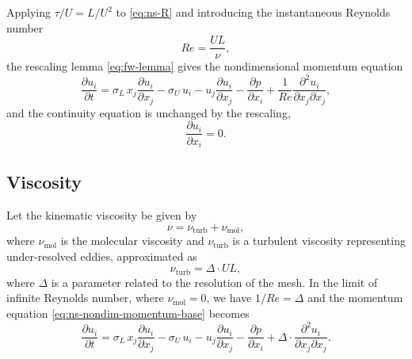 Applying $\tau / U = L/U^2$ to \eqref{eq:ns-R} and introducing the
instantaneous Reynolds number
\begin{equation}\label{eq:ns-reynolds}
  Re = \frac{U L}{\nu},
\end{equation}
the rescaling lemma \eqref{eq:fw-lemma} gives the nondimensional momentum
equation
\begin{equation}\label{eq:ns-nondim-momentum-base}
  \frac{\partial u_i}{\partial t}
  = \sigma_L\, x_j \frac{\partial u_i}{\partial x_j}
  - \sigma_U\, u_i
  - u_j \frac{\partial u_i}{\partial x_j}
  - \frac{\partial p}{\partial x_i}
  + \frac{1}{Re} \frac{\partial^2 u_i}{\partial x_j \partial x_j},
\end{equation}
and the continuity equation is unchanged by the rescaling,
\begin{equation}\label{eq:ns-nondim-continuity}
  \frac{\partial u_i}{\partial x_i} = 0.
\end{equation}

\subsection{Viscosity}\label{ssec:ns-viscosity}
Let the kinematic viscosity be given by
\begin{equation}\label{eq:ns-viscosity-split}
  \nu = \nu_{\mathrm{turb}} + \nu_{\mathrm{mol}},
\end{equation}
where $\nu_{\mathrm{mol}}$ is the molecular viscosity and $\nu_{\mathrm{turb}}$
is a turbulent viscosity representing under-resolved eddies, approximated as
\begin{equation}\label{eq:ns-turb-viscosity}
  \nu_{\mathrm{turb}} = \Delta \cdot U L,
\end{equation}
where $\Delta$ is a parameter related to the resolution of the mesh. In the
limit of infinite Reynolds number, where $\nu_{\mathrm{mol}} = 0$, we have
$1/Re = \Delta$ and the momentum equation
\eqref{eq:ns-nondim-momentum-base} becomes
\begin{equation}\label{eq:ns-nondim-momentum}
  \frac{\partial u_i}{\partial t}
  = \sigma_L\, x_j \frac{\partial u_i}{\partial x_j}
  - \sigma_U\, u_i
  - u_j \frac{\partial u_i}{\partial x_j}
  - \frac{\partial p}{\partial x_i}
  + \Delta \cdot \frac{\partial^2 u_i}{\partial x_j \partial x_j}.
\end{equation}

